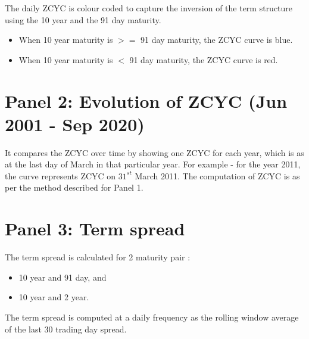 \documentclass[12pt]{article}
\begin{document}
The daily ZCYC is colour coded to capture the inversion of the term structure using the 10 year and the 91 day maturity.
\begin{itemize}
\item When 10 year maturity is $>=$ 91 day maturity, the ZCYC curve is blue.
\item When 10 year maturity is $<$ 91 day maturity, the ZCYC curve is red.
\end{itemize}

\section*{Panel 2: Evolution of ZCYC (Jun 2001 - Sep 2020)}

It compares the ZCYC over time by showing one ZCYC for each year, which is as at the last day of March in that particular year. 
For example - for the year 2011, the curve represents ZCYC on $31^{st}$ March 2011. The computation of ZCYC is as per the method described for Panel 1.

\section*{Panel 3: Term spread}

The term spread is calculated for 2 maturity pair :
\begin{itemize}
\item 10 year and 91 day, and 
\item 10 year and 2 year. 
\end{itemize}
The term spread is computed at a daily frequency as the rolling window average of the last 30 trading day spread.
\end{document}
